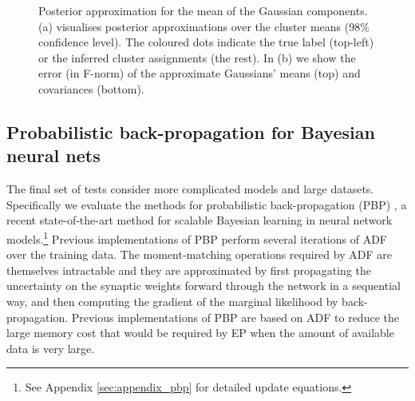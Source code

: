 \begin{figure}
\centering
{}
%
\hspace{0.1in}
%
\caption{Posterior approximation for the mean of the Gaussian components. (a) visualises posterior approximations over the cluster means (98\% confidence level). The coloured dots indicate the true label (top-left) or the inferred cluster assignments (the rest). In (b) we show the error (in F-norm) of the approximate Gaussians' means (top) and covariances (bottom). }
\end{figure}

\subsection{Probabilistic back-propagation for Bayesian neural nets}

The final set of tests consider more complicated models and large datasets. Specifically we evaluate the methods for probabilistic back-propagation (PBP) \citep{hernandez-lobato:pbp2015}, a
recent state-of-the-art method for scalable Bayesian learning in neural
network models.\footnote{See Appendix \ref{sec:appendix_pbp} for detailed update equations.} Previous implementations of PBP perform several iterations of ADF over the training
data. The moment-matching operations required by ADF are themselves intractable and they are approximated by first propagating the uncertainty on the synaptic weights forward through the network in a sequential way, 
and then computing the gradient of the marginal likelihood by back-propagation.
Previous implementations of PBP are based on ADF to reduce the large memory cost that would be required by EP when the amount of available data is very large.

